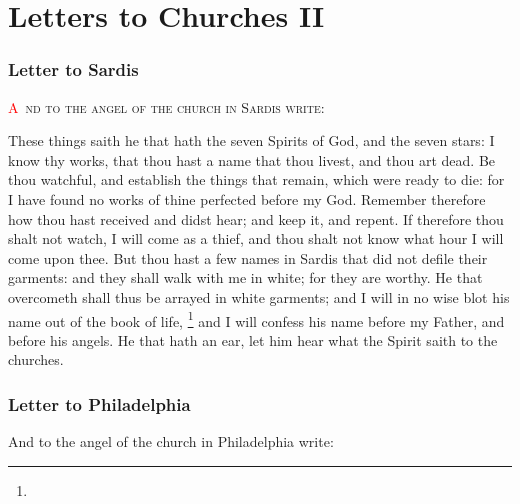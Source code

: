 \chapter{Letters to Churches II}
\subsection*{Letter to Sardis}
\lettrine[lines=3]{\textcolor{red}{A}}{\ nd to the angel of the church in Sardis write:}

\zz These things saith he that hath the seven Spirits of God, and the seven stars: I know thy works, that thou hast a name that thou livest, and thou art dead. %
Be thou watchful, and establish the things that remain, which were ready to die: for I have found no works of thine perfected before my God. %
Remember therefore how thou hast received and didst hear; and keep it, and repent. If therefore thou shalt not watch, I will come as a thief, and thou shalt not know what hour I will come upon thee. %
But thou hast a few names in Sardis that did not defile their garments: and they shall walk with me in white; for they are worthy. %
He that overcometh shall thus be arrayed in white garments; and I will in no wise blot his name out of the book of life,%
	\footnote{ %
			} %
and I will confess his name before my Father, and before his angels. %
He that hath an ear, let him hear what the Spirit saith to the churches.
\subsection*{Letter to Philadelphia}
And to the angel of the church in Philadelphia write:


